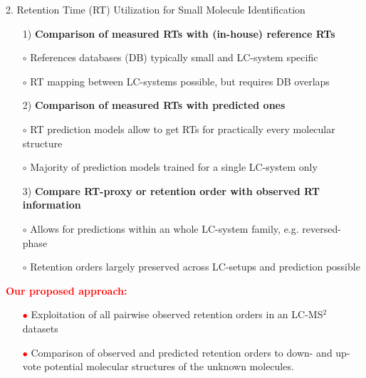 \documentclass{beamer}
\newcommand{\ms}{MS}
\newcommand{\lc}{LC}
\newcommand{\msms}{\ms$^2$}
\newcommand{\lcmsms}{\lc-\msms}
\begin{document}
\begin{frame}{}
\begin{columns}[T]
    \begin{block}{{\normalsize 2. Retention Time (RT) Utilization for Small Molecule Identification}}
    \begin{itemize}
        \item[1)] \textbf{Comparison of measured RTs with (in-house) reference RTs}
        \item[$\circ$] References databases (DB) typically small and \lc-system specific
        \item[$\circ$] RT mapping between \lc-systems possible, but requires DB overlaps \cite{Stanstrup2015}
        \item[2)] \textbf{Comparison of measured RTs with predicted ones} \cite{Aicheler2015}  
        \item[$\circ$] RT prediction models allow to get RTs for practically every molecular structure
        \item[$\circ$] Majority of prediction models trained for a single \lc-system only
        \item[3)] \textbf{Compare RT-proxy or retention order with observed RT information} \cite{Ruttkies2016, Bach2018}
        \item[$\circ$] Allows for predictions within an whole \lc-system family, e.g. reversed-phase
        \item[$\circ$] Retention orders largely preserved across \lc-setups and prediction possible 
    \end{itemize}
    \vspace{0.25cm}
    \textcolor{red}{\bf Our proposed approach:}
    \begin{itemize}
        \item[\textcolor{red}{$\bullet$}] Exploitation of all pairwise observed retention orders in an \lcmsms{} datasets
        \item[\textcolor{red}{$\bullet$}] Comparison of observed and predicted retention orders to down- and up-vote potential molecular structures of the unknown molecules.
    \end{itemize}

    \end{block}


\end{columns}
\end{frame}
\end{document}
